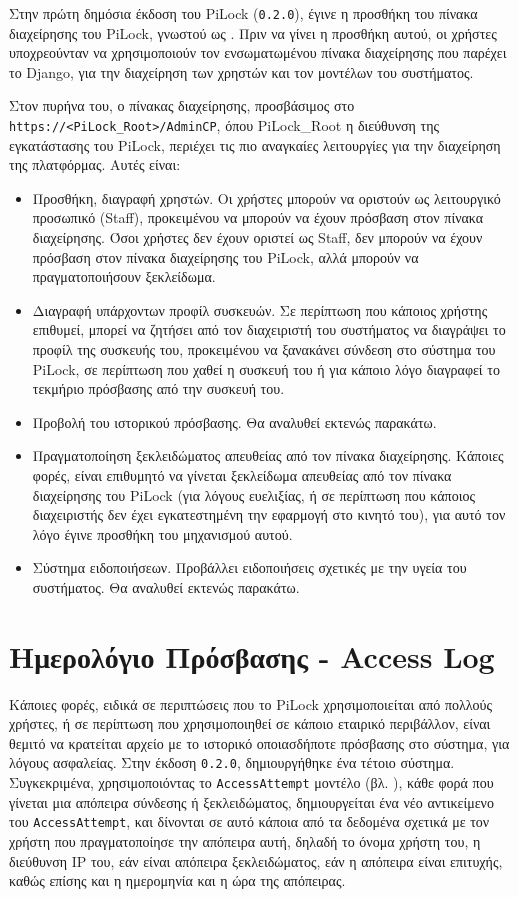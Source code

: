 Στην πρώτη δημόσια έκδοση του PiLock (\verb|0.2.0|), έγινε η προσθήκη του πίνακα διαχείρησης του PiLock, γνωστού ως . Πριν να γίνει η προσθήκη αυτού, οι χρήστες υποχρεούνταν να χρησιμοποιούν τον ενσωματωμένου πίνακα διαχείρησης που παρέχει το Django, για την διαχείρηση των χρηστών και τον μοντέλων του συστήματος.

Στον πυρήνα του, ο πίνακας διαχείρησης, προσβάσιμος στο \verb|https://<PiLock_Root>/AdminCP|, όπου PiLock\_Root η διεύθυνση της εγκατάστασης του PiLock, περιέχει τις πιο αναγκαίες λειτουργίες για την διαχείρηση της πλατφόρμας. Αυτές είναι:

\begin{itemize}
	\item Προσθήκη, διαγραφή χρηστών. Οι χρήστες μπορούν να οριστούν ως λειτουργικό προσωπικό (Staff), προκειμένου να μπορούν να έχουν πρόσβαση στον πίνακα διαχείρησης. Όσοι χρήστες δεν έχουν οριστεί ως Staff, δεν μπορούν να έχουν πρόσβαση στον πίνακα διαχείρησης του PiLock, αλλά μπορούν να πραγματοποιήσουν ξεκλείδωμα.
	\item Διαγραφή υπάρχοντων προφίλ συσκευών. Σε περίπτωση που κάποιος χρήστης επιθυμεί, μπορεί να ζητήσει από τον διαχειριστή του συστήματος να διαγράψει το προφίλ της συσκευής του, προκειμένου να ξανακάνει σύνδεση στο σύστημα του PiLock, σε περίπτωση που χαθεί η συσκευή του ή για κάποιο λόγο διαγραφεί το τεκμήριο πρόσβασης από την συσκευή του.
	\item Προβολή του ιστορικού πρόσβασης. Θα αναλυθεί εκτενώς παρακάτω.
	\item Πραγματοποίηση ξεκλειδώματος απευθείας από τον πίνακα διαχείρησης. Κάποιες φορές, είναι επιθυμητό να γίνεται ξεκλείδωμα απευθείας από τον πίνακα διαχείρησης του PiLock (για λόγους ευελιξίας, ή σε περίπτωση που κάποιος διαχειριστής δεν έχει εγκατεστημένη την εφαρμογή στο κινητό του), για αυτό τον λόγο έγινε προσθήκη του μηχανισμού αυτού.  %
	\item Σύστημα ειδοποιήσεων. Προβάλλει ειδοποιήσεις σχετικές με την υγεία του συστήματος. Θα αναλυθεί εκτενώς παρακάτω.
\end{itemize}

\section{Ημερολόγιο Πρόσβασης - Access Log}
	Κάποιες φορές, ειδικά σε περιπτώσεις που το PiLock χρησιμοποιείται από πολλούς χρήστες, ή σε περίπτωση που χρησιμοποιηθεί σε κάποιο εταιρικό περιβάλλον, είναι θεμιτό να κρατείται αρχείο με το ιστορικό οποιασδήποτε πρόσβασης στο σύστημα, για λόγους ασφαλείας. Στην έκδοση \verb|0.2.0|, δημιουργήθηκε ένα τέτοιο σύστημα. Συγκεκριμένα, χρησιμοποιόντας το \verb|AccessAttempt| μοντέλο (βλ. ), κάθε φορά που γίνεται μια απόπειρα σύνδεσης ή ξεκλειδώματος, δημιουργείται ένα νέο αντικείμενο του \verb|AccessAttempt|, και δίνονται σε αυτό κάποια από τα δεδομένα σχετικά με τον χρήστη που πραγματοποίησε την απόπειρα αυτή, δηλαδή το όνομα χρήστη του, η διεύθυνση IP του, εάν είναι απόπειρα ξεκλειδώματος, εάν η απόπειρα είναι επιτυχής, καθώς επίσης και η ημερομηνία και η ώρα της απόπειρας.


